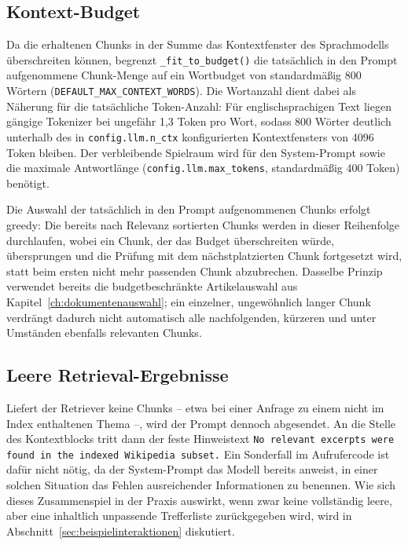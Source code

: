 \subsection{Kontext-Budget}

Da die erhaltenen Chunks in der Summe das Kontextfenster des
Sprachmodells überschreiten können, begrenzt \texttt{\_\allowbreak{}fit\_\allowbreak{}to\_\allowbreak{}budget()} die
tatsächlich in den Prompt aufgenommene Chunk-Menge auf ein Wortbudget von
standardmäßig 800 Wörtern (\texttt{DEFAULT\_\allowbreak{}MAX\_\allowbreak{}CONTEXT\_\allowbreak{}WORDS}). Die Wortanzahl dient
dabei als Näherung für die tatsächliche Token-Anzahl: Für englischsprachigen Text
liegen gängige Tokenizer bei ungefähr 1,3 Token pro Wort, sodass 800 Wörter deutlich
unterhalb des in \texttt{config.llm.n\_ctx} konfigurierten Kontextfensters von 4096
Token bleiben. Der verbleibende Spielraum wird für den System-Prompt sowie die
maximale Antwortlänge (\texttt{config.\allowbreak{}llm.\allowbreak{}max\_\allowbreak{}tokens}, standardmäßig 400 Token)
benötigt.

Die Auswahl der tatsächlich in den Prompt aufgenommenen Chunks erfolgt greedy: Die
bereits nach Relevanz sortierten Chunks werden in dieser Reihenfolge durchlaufen,
wobei ein Chunk, der das Budget überschreiten würde, übersprungen und die Prüfung mit
dem nächstplatzierten Chunk fortgesetzt wird, statt beim ersten nicht mehr passenden
Chunk abzubrechen. Dasselbe Prinzip verwendet bereits die budgetbeschränkte
Artikelauswahl aus Kapitel~\ref{ch:dokumentenauswahl}; ein einzelner, ungewöhnlich
langer Chunk verdrängt dadurch nicht automatisch alle nachfolgenden, kürzeren und
unter Umständen ebenfalls relevanten Chunks.

\subsection{Leere Retrieval-Ergebnisse}

Liefert der Retriever keine Chunks -- etwa bei
einer Anfrage zu einem nicht im Index enthaltenen Thema --, wird der Prompt dennoch
abgesendet. An die Stelle des Kontextblocks tritt dann der feste Hinweistext
\texttt{No relevant excerpts were found in the indexed Wikipedia subset.\allowbreak{}} Ein
Sonderfall im Aufrufercode ist dafür nicht nötig, da der System-Prompt das Modell
bereits anweist, in einer solchen Situation das Fehlen ausreichender Informationen zu
benennen. Wie sich dieses Zusammenspiel in der Praxis auswirkt, wenn zwar keine
vollständig leere, aber eine inhaltlich unpassende Trefferliste zurückgegeben wird,
wird in Abschnitt~\ref{sec:beispielinteraktionen} diskutiert.


